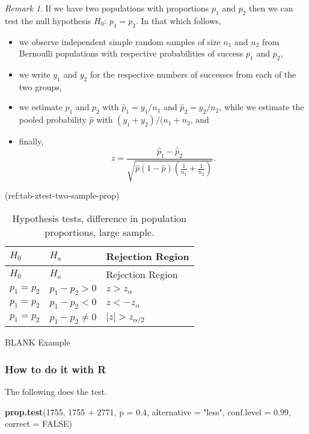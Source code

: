 \documentclass[]{book}
\newenvironment{Shaded}{\begin{snugshade}}{\end{snugshade}}
\newcommand{\KeywordTok}[1]{\textcolor[rgb]{0.13,0.29,0.53}{\textbf{{#1}}}}
\newcommand{\DataTypeTok}[1]{\textcolor[rgb]{0.13,0.29,0.53}{{#1}}}
\newcommand{\DecValTok}[1]{\textcolor[rgb]{0.00,0.00,0.81}{{#1}}}
\newcommand{\FloatTok}[1]{\textcolor[rgb]{0.00,0.00,0.81}{{#1}}}
\newcommand{\StringTok}[1]{\textcolor[rgb]{0.31,0.60,0.02}{{#1}}}
\newcommand{\OtherTok}[1]{\textcolor[rgb]{0.56,0.35,0.01}{{#1}}}
\newcommand{\NormalTok}[1]{{#1}}
\providecommand{\tightlist}{%
  \setlength{\itemsep}{0pt}\setlength{\parskip}{0pt}}
\numberwithin{equation}{chapter}
\numberwithin{figure}{chapter}
\theoremstyle{plain}
\theoremstyle{definition}
\theoremstyle{remark}
\theoremstyle{definition}
\theoremstyle{definition}
\theoremstyle{remark}
\newtheorem*{remark}{Remark}
\begin{document}
\begin{remark}
If we have two populations with proportions \(p_{1}\) and \(p_{2}\) then
we can test the null hypothesis \(H_{0}:\,p_{1} = p_{2}\). In that which
follows,

\begin{itemize}
\tightlist
\item
  we observe independent simple random samples of size \(n_{1}\) and
  \(n_{2}\) from Bernoulli populations with respective probabilities of
  success \(p_{1}\) and \(p_{2}\),
\item
  we write \(y_{1}\) and \(y_{2}\) for the respective numbers of
  successes from each of the two groups,
\item
  we estimate \(p_{1}\) and \(p_{2}\) with
  \(\hat{p}_{1} = y_{1}/n_{1}  \) and \(\hat{p}_{2} = y_{2}/n_{2}\),
  while we estimate the pooled probability \(\hat{p}\) with
  \((y_{1} + y_{2})/(n_{1} + n_{2}\), and
\item
  finally,
  \[z = \frac{\hat{p}_{1} - \hat{p}_{2}}{\sqrt{\hat{p}(1 - \hat{p})\left( \frac{1}{n_{1}} + \frac{1}{n_{2}} \right)}}. \]
\end{itemize}
\end{remark}

\bigskip

(ref:tab-ztest-two-sample-prop)

\begin{longtable}[]{@{}lll@{}}
\caption{Hypothesis tests, difference in population proportions, large
sample.}\tabularnewline
\toprule
\(H_{0}\) & \(H_{a}\) & Rejection Region\tabularnewline
\midrule
\endfirsthead
\toprule
\(H_{0}\) & \(H_{a}\) & Rejection Region\tabularnewline
\midrule
\endhead
\(p_{1} = p_{2}\) & \(p_{1} - p_{2} > 0\) &
\(z > z_{\alpha}\)\tabularnewline
\(p_{1} = p_{2}\) & \(p_{1} - p_{2} < 0\) &
\(z < -z_{\alpha}\)\tabularnewline
\(p_{1} = p_{2}\) & \(p_{1} - p_{2} \neq 0\) &
\(\vert z \vert > z_{\alpha/2}\)\tabularnewline
\bottomrule
\end{longtable}

BLANK Example

\subsubsection{How to do it with R}\label{how-to-do-it-with-r-40}

The following does the test.

\begin{Shaded}
\begin{Highlighting}[]
\KeywordTok{prop.test}\NormalTok{(}\DecValTok{1755}\NormalTok{, }\DecValTok{1755} \NormalTok{+}\StringTok{ }\DecValTok{2771}\NormalTok{, }\DataTypeTok{p =} \FloatTok{0.4}\NormalTok{, }\DataTypeTok{alternative =} \StringTok{"less"}\NormalTok{, }
          \DataTypeTok{conf.level =} \FloatTok{0.99}\NormalTok{, }\DataTypeTok{correct =} \OtherTok{FALSE}\NormalTok{)}
\end{Highlighting}
\end{Shaded}
\end{document}
